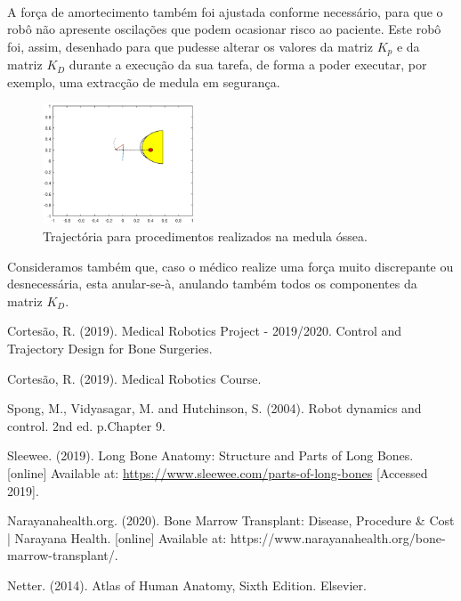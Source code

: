 \documentclass[a4paper,twocolumn,final,11pt]{article}
\begin{document}
\\
A força de amortecimento também foi ajustada conforme necessário, para que o robô não apresente oscilações que podem ocasionar risco ao paciente.
Este robô foi, assim, desenhado para que pudesse alterar os valores da matriz $K_p$ e da matriz $K_D$ durante a execução da sua tarefa, de forma a poder executar, por exemplo, uma extracção de medula em segurança. 

\begin{figure}[H]
	\centering
	\includegraphics[width=0.4\textwidth]{medula.eps}
	\caption{Trajectória para procedimentos realizados na medula óssea.}
\label{medula}
\end{figure}

 Consideramos também que, caso o médico realize uma força muito discrepante ou desnecessária, esta anular-se-à, anulando também todos os componentes da matriz $K_D$.


\begin{thebibliography}{9}
Cortesão, R. (2019). Medical Robotics Project - 2019/2020. Control and Trajectory Design for Bone Surgeries.

Cortesão, R. (2019). Medical Robotics Course.

Spong, M., Vidyasagar, M. and Hutchinson, S. (2004). Robot dynamics and control. 2nd ed. p.Chapter 9.

Sleewee. (2019). Long Bone Anatomy: Structure and Parts of Long Bones. [online] Available at: \url{https://www.sleewee.com/parts-of-long-bones} [Accessed 2019].

Narayanahealth.org. (2020). Bone Marrow Transplant: Disease, Procedure & Cost | Narayana Health. [online] Available at: https://www.narayanahealth.org/bone-marrow-transplant/.

Netter. (2014). Atlas of Human Anatomy, Sixth Edition. Elsevier.


\end{thebibliography}
\end{document}
